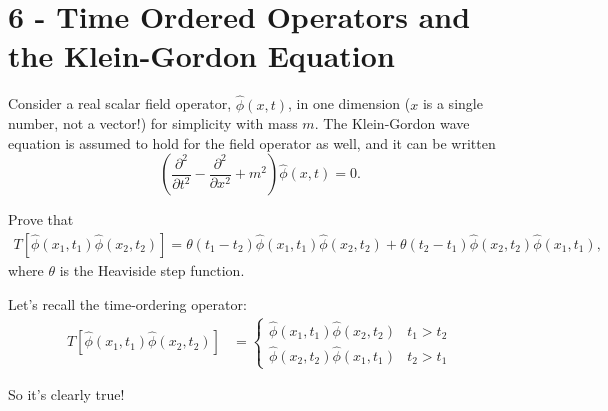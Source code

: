 \documentclass[working, oneside]{../../Preambles/tuftebook}
\begin{document}
\let\cleardoublepage\clearpage
\thispagestyle{fancy}
\chapter{6 - Time Ordered Operators and the Klein-Gordon Equation}

Consider a real scalar field operator, $\hat{\phi}(x, t)$, in one dimension ($x$ is a single number, not a vector!) for simplicity with mass $m$. The Klein-Gordon wave equation is assumed to hold for the field operator as well, and it can be written
$$
\left( \frac{\partial^2}{\partial t^2} - \frac{\partial^2}{\partial x^2} + m^2 \right) \hat{\phi}(x, t) = 0.
$$

\begin{exercise}[1]
Prove that
\begin{align*}
T \left[ \hat{\phi}(x_1, t_1) \hat{\phi}(x_2, t_2) \right] = \theta(t_1 - t_2) \hat{\phi}(x_1, t_1) \hat{\phi}(x_2, t_2) + \theta(t_2 - t_1) \hat{\phi}(x_2, t_2) \hat{\phi}(x_1, t_1),
\end{align*}
where $\theta$ is the Heaviside step function.
\end{exercise}
\begin{solution}
Let's recall the time-ordering operator:
\begin{align*}
T \left[ \hat{\phi}(x_1, t_1) \hat{\phi}(x_2, t_2) \right]
&= \begin{cases}
\hat{\phi}(x_1, t_1) \hat{\phi}(x_2, t_2) & t_1 > t_2 \\
\hat{\phi}(x_2, t_2) \hat{\phi}(x_1, t_1) & t_2 > t_1
\end{cases}
\end{align*}

So it's clearly true!

\end{solution}
\end{document}
